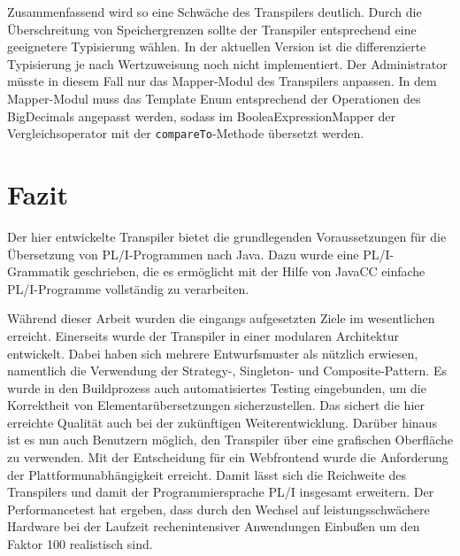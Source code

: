 Zusammenfassend wird so eine Schwäche des Transpilers deutlich. Durch die Überschreitung von Speichergrenzen sollte der Transpiler entsprechend eine geeignetere Typisierung wählen. In der aktuellen Version ist die differenzierte Typisierung je nach Wertzuweisung noch nicht implementiert. Der Administrator müsste in diesem Fall nur das Mapper-Modul des Transpilers anpassen. In dem Mapper-Modul muss das Template Enum entsprechend der Operationen des BigDecimals angepasst werden, sodass im BooleaExpressionMapper der Vergleichsoperator mit der \verb+compareTo+-Methode übersetzt werden.
\pagebreak

\section{Fazit}
Der hier entwickelte Transpiler bietet die grundlegenden Voraussetzungen für die Übersetzung von PL/I-Programmen nach Java.
Dazu wurde eine PL/I-Grammatik geschrieben, die es ermöglicht mit der Hilfe von JavaCC einfache PL/I-Programme vollständig zu verarbeiten.





Während dieser Arbeit wurden die eingangs aufgesetzten Ziele im wesentlichen erreicht. 
Einerseits wurde der Transpiler in einer modularen Architektur entwickelt. Dabei haben sich mehrere Entwurfsmuster als nützlich erwiesen,
namentlich die Verwendung der Strategy-, Singleton- und Composite-Pattern.
Es wurde in den Buildprozess auch automatisiertes Testing eingebunden, um die Korrektheit von Elementarübersetzungen sicherzustellen. Das sichert die hier erreichte Qualität auch bei der zukünftigen Weiterentwicklung.
Darüber hinaus ist es nun auch Benutzern möglich, den Transpiler über eine grafischen Oberfläche zu verwenden.
Mit der Entscheidung für ein Webfrontend wurde die Anforderung der Plattformunabhängigkeit erreicht. Damit lässt sich die Reichweite des Transpilers und damit der Programmiersprache PL/I insgesamt erweitern.
Der Performancetest hat ergeben, dass durch den Wechsel auf leistungsschwächere Hardware bei der Laufzeit rechenintensiver Anwendungen Einbußen um den Faktor 100 realistisch sind.

